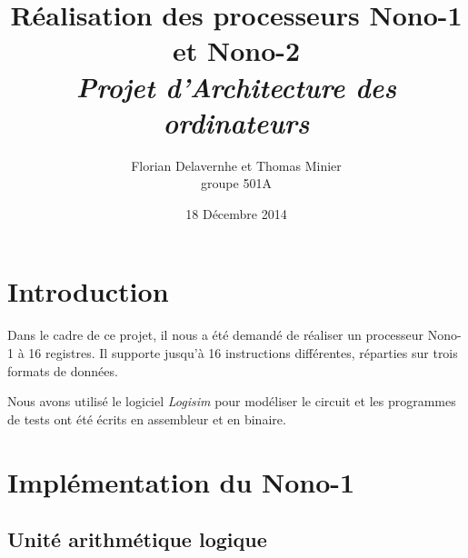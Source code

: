 \documentclass[10pt,a4paper]{article}
\title{Réalisation des processeurs Nono-1 et Nono-2 \\ \textit{Projet d'Architecture des ordinateurs}}
\author{Florian Delavernhe et Thomas Minier \\ groupe 501A}
\date{18 Décembre 2014}
\begin{document}
\maketitle
\vspace{3cm}
\tableofcontents
\newpage

\section{Introduction}

Dans le cadre de ce projet, il nous a été demandé de réaliser un processeur Nono-1 à 16 registres. Il supporte jusqu'à 16 instructions différentes, réparties sur trois formats de données.

Nous avons utilisé le logiciel \textit{Logisim} pour modéliser le circuit et les programmes de tests ont été écrits en assembleur et en binaire.

\section{Implémentation du Nono-1}

\subsection{Unité arithmétique logique}
\end{document}
